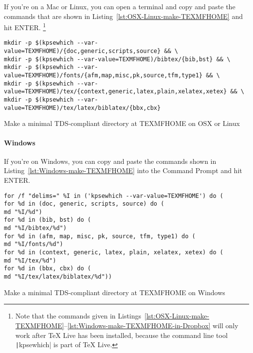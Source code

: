 If you're on a Mac or Linux, you can open a terminal and copy and paste the commands that are shown in Listing~\ref{lst:OSX-Linux-make-TEXMFHOME} and hit ENTER.%
\footnote{%
\label{fn:kpsewhich}%
Note that the commands given in Listings~\ref{lst:OSX-Linux-make-TEXMFHOME}--\ref{lst:Windows-make-TEXMFHOME-in-Dropbox} will only work after TeX Live has been installed, because the command line tool \texttt|kpsewhich| is part of TeX Live.%
}

\begin{listing}[htbp]
	\centering
	\begin{verbatim}
mkdir -p $(kpsewhich --var-value=TEXMFHOME)/{doc,generic,scripts,source} && \
mkdir -p $(kpsewhich --var-value=TEXMFHOME)/bibtex/{bib,bst} && \
mkdir -p $(kpsewhich --var-value=TEXMFHOME)/fonts/{afm,map,misc,pk,source,tfm,type1} && \
mkdir -p $(kpsewhich --var-value=TEXMFHOME)/tex/{context,generic,latex,plain,xelatex,xetex} && \
mkdir -p $(kpsewhich --var-value=TEXMFHOME)/tex/latex/biblatex/{bbx,cbx}
	\end{verbatim}
	\caption{Make a minimal TDS-compliant directory at TEXMFHOME on OSX or Linux}
	\label{lst:OSX-Linux-make-TEXMFHOME}
\end{listing}

\paragraph{Windows}

If you're on Windows, you can copy and paste the commands shown in Listing~\ref{lst:Windows-make-TEXMFHOME} into the Command Prompt and hit ENTER.

\begin{listing}[htbp]
	\centering
	\begin{verbatim}
for /f "delims=" %I in ('kpsewhich --var-value=TEXMFHOME') do (
for %d in (doc, generic, scripts, source) do (
md "%I/%d")
for %d in (bib, bst) do (
md "%I/bibtex/%d")
for %d in (afm, map, misc, pk, source, tfm, type1) do (
md "%I/fonts/%d")
for %d in (context, generic, latex, plain, xelatex, xetex) do (
md "%I/tex/%d")
for %d in (bbx, cbx) do (
md "%I/tex/latex/biblatex/%d"))
	\end{verbatim}
	\caption{Make a minimal TDS-compliant directory at TEXMFHOME on Windows}
	\label{lst:Windows-make-TEXMFHOME}
\end{listing}

\label{subsubsubsec:symlink-your-local-texmf-folder-into-TEXMFHOME}

